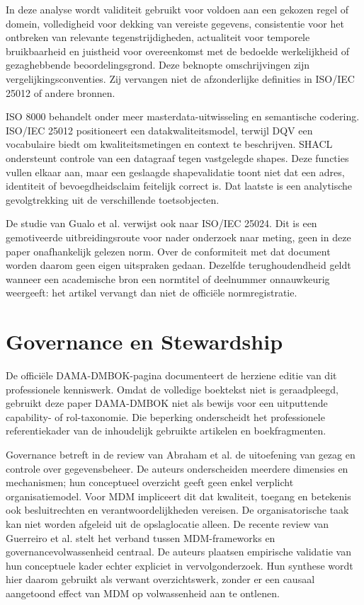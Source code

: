 In deze analyse wordt validiteit gebruikt voor voldoen aan een gekozen regel of domein, volledigheid voor dekking van vereiste gegevens, consistentie voor het ontbreken van relevante tegenstrijdigheden, actualiteit voor temporele bruikbaarheid en juistheid voor overeenkomst met de bedoelde werkelijkheid of gezaghebbende beoordelingsgrond. Deze beknopte omschrijvingen zijn vergelijkingsconventies. Zij vervangen niet de afzonderlijke definities in ISO/IEC 25012 of andere bronnen. \parencite{S12,L19}

ISO 8000 behandelt onder meer masterdata-uitwisseling en semantische codering. ISO/IEC 25012 positioneert een datakwaliteitsmodel, terwijl DQV een vocabulaire biedt om kwaliteitsmetingen en context te beschrijven. SHACL ondersteunt controle van een datagraaf tegen vastgelegde shapes. Deze functies vullen elkaar aan, maar een geslaagde shapevalidatie toont niet dat een adres, identiteit of bevoegdheidsclaim feitelijk correct is. Dat laatste is een analytische gevolgtrekking uit de verschillende toetsobjecten. \parencite{S02,S03,S12,S32,S34}

De studie van Gualo et al. verwijst ook naar ISO/IEC 25024. Dit is een gemotiveerde uitbreidingsroute voor nader onderzoek naar meting, geen in deze paper onafhankelijk gelezen norm. Over de conformiteit met dat document worden daarom geen eigen uitspraken gedaan. Dezelfde terughoudendheid geldt wanneer een academische bron een normtitel of deelnummer onnauwkeurig weergeeft: het artikel vervangt dan niet de officiële normregistratie. \parencite{L19}

\section{Governance en Stewardship}
De officiële DAMA-DMBOK-pagina documenteert de herziene editie van dit professionele kenniswerk. Omdat de volledige boektekst niet is geraadpleegd, gebruikt deze paper DAMA-DMBOK niet als bewijs voor een uitputtende capability- of rol-taxonomie. Die beperking onderscheidt het professionele referentiekader van de inhoudelijk gebruikte artikelen en boekfragmenten. \parencite{S01}

Governance betreft in de review van Abraham et al. de uitoefening van gezag en controle over gegevensbeheer. De auteurs onderscheiden meerdere dimensies en mechanismen; hun conceptueel overzicht geeft geen enkel verplicht organisatiemodel. Voor MDM impliceert dit dat kwaliteit, toegang en betekenis ook besluitrechten en verantwoordelijkheden vereisen. De organisatorische taak kan niet worden afgeleid uit de opslaglocatie alleen. \parencite{L07,L20} De recente review van Guerreiro et al. stelt het verband tussen MDM-frameworks en governancevolwassenheid centraal. De auteurs plaatsen empirische validatie van hun conceptuele kader echter expliciet in vervolgonderzoek. Hun synthese wordt hier daarom gebruikt als verwant overzichtswerk, zonder er een causaal aangetoond effect van MDM op volwassenheid aan te ontlenen. \parencite{L27}

